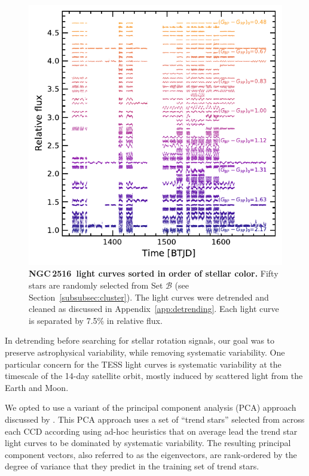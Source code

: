 \documentclass[12pt,twocolumn,tighten]{aastex63}
\newcommand{\cn}{NGC\,2516} %
\begin{document}
\begin{figure}[btp]
	\begin{center}
		\leavevmode
		\includegraphics[width=\textwidth]{f12.pdf}
	\end{center}
	\vspace{-1cm}
  \caption{ {\bf \cn\ light curves sorted in order
  of stellar color.} Fifty stars are randomly selected from Set
  $\mathcal{B}$ (see Section~\ref{subsubsec:cluster}). The light
  curves were detrended and cleaned as discussed in
  Appendix~\ref{app:detrending}.  Each light curve is separated by
  7.5\% in relative flux.
  \label{fig:lightcurves}
	}
\end{figure}



In detrending before searching for stellar rotation signals, our goal
was to preserve astrophysical variability, while removing systematic
variability.  One particular concern for the TESS light curves is
systematic variability at the timescale of the 14-day satellite orbit,
mostly induced by scattered light from the Earth and Moon.

We opted to use a variant of the principal component analysis (PCA)
approach discussed by \citet{bouma_cdipsI_2019}. This PCA approach
uses a set of ``trend stars'' selected from across each CCD according
using ad-hoc heuristics that on average lead the trend star light
curves to be dominated by systematic variability.  The resulting
principal component vectors, also referred to as the eigenvectors, are
rank-ordered by the degree of variance that they predict in the
training set of trend stars.
\end{document}
